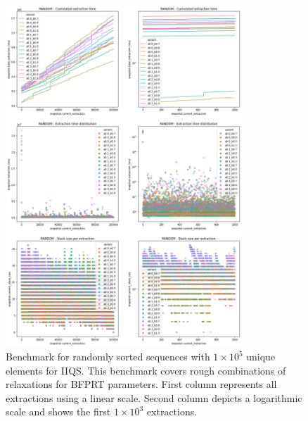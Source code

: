\begin{figure}[p]
    \centering
    \includegraphics[width=0.79\textwidth]{./fragments/04_experimental_execution/images/04_alphabeta_detail_random.png}
    \caption{Benchmark for randomly sorted sequences with $1\times10^5$ unique elements for IIQS. This benchmark covers rough combinations of relaxations for BFPRT parameters. First column represents all extractions using a linear scale. Second column depicts a logarithmic scale and shows the first $1\times10^3$ extractions. }
    \label{FIG:05_ALPHABETA_BENCHMARK_RANDOM}
\end{figure}


